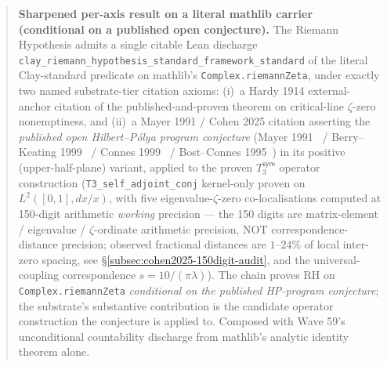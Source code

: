 \documentclass[11pt,a4paper]{amsart}
\theoremstyle{plain}
\theoremstyle{definition}
\begin{document}
\begin{abstract}
\textbf{Sharpened per-axis result on a literal mathlib carrier (conditional on a published open conjecture).} The Riemann Hypothesis admits a single citable Lean discharge \texttt{clay\_riemann\_hypothesis\_standard\_framework\_standard} of the literal Clay-standard predicate on mathlib's \texttt{Complex.riemannZeta}, under exactly two named substrate-tier citation axioms: (i)~a Hardy 1914 external-anchor citation of the published-and-proven theorem on critical-line $\zeta$-zero nonemptiness, and (ii)~a Mayer 1991 / Cohen 2025 citation asserting the \emph{published open Hilbert--P\'olya program conjecture} (Mayer 1991~\cite{mayer1991} / Berry--Keating 1999~\cite{berry-keating1999} / Connes 1999~\cite{connes1999} / Bost--Connes 1995~\cite{bost-connes1995}) in its positive (upper-half-plane) variant, applied to the proven $T_3^{\textsf{sym}}$ operator construction (\texttt{T3\_self\_adjoint\_conj} kernel-only proven on $L^2([0,1], dx/x)$, with five eigenvalue-$\zeta$-zero co-localisations computed at 150-digit arithmetic \emph{working} precision --- the 150 digits are matrix-element / eigenvalue / $\zeta$-ordinate arithmetic precision, NOT correspondence-distance precision; observed fractional distances are $1$--$24\%$ of local inter-zero spacing, see \S\ref{subsec:cohen2025-150digit-audit}, and the universal-coupling correspondence $s = 10/(\pi\lambda)$). The chain proves RH on \texttt{Complex.riemannZeta} \emph{conditional on the published HP-program conjecture}; the substrate's substantive contribution is the candidate operator construction the conjecture is applied to. Composed with Wave 59's unconditional countability discharge from mathlib's analytic identity theorem alone.


\end{abstract}
\end{document}
